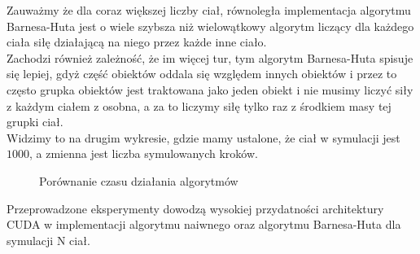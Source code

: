 \documentclass[14pt,twoside,a4paper]{article}
\theoremstyle{definition}
\begin{document}
Zauważmy że dla coraz większej liczby ciał, równoległa implementacja algorytmu Barnesa-Huta jest o wiele szybsza niż wielowątkowy algorytm liczący dla każdego ciała siłę działającą na niego przez każde inne ciało. \\
Zachodzi również zależność, że im więcej tur, tym algorytm Barnesa-Huta spisuje się lepiej, gdyż część obiektów oddala się względem innych obiektów i przez to często grupka obiektów jest traktowana jako jeden obiekt i nie musimy liczyć siły z każdym ciałem z osobna, a za to liczymy siłę tylko raz z środkiem masy tej grupki ciał.\\
Widzimy to na drugim wykresie, gdzie mamy ustalone, że ciał w symulacji jest $1000$, a zmienna jest liczba symulowanych kroków.
\begin{figure}[h]
\caption{Porównanie czasu działania algorytmów}
\end{figure}

Przeprowadzone eksperymenty dowodzą wysokiej przydatności architektury CUDA w implementacji algorytmu naiwnego oraz algorytmu Barnesa-Huta dla symulacji N ciał.
\newpage
\nocite{*}
\printbibliography[title=\foreignlanguage{polish}{Literatura}]
\end{document}
